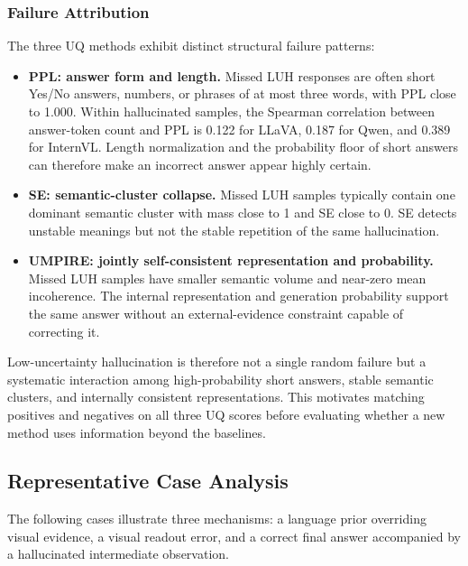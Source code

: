 \subsubsection{Failure Attribution}

The three UQ methods exhibit distinct structural failure patterns:

\begin{itemize}[leftmargin=2em]
\item \textbf{PPL: answer form and length.} Missed LUH responses are often short Yes/No answers, numbers, or phrases of at most three words, with PPL close to 1.000. Within hallucinated samples, the Spearman correlation between answer-token count and PPL is 0.122 for LLaVA, 0.187 for Qwen, and 0.389 for InternVL. Length normalization and the probability floor of short answers can therefore make an incorrect answer appear highly certain.
\item \textbf{SE: semantic-cluster collapse.} Missed LUH samples typically contain one dominant semantic cluster with mass close to 1 and SE close to 0. SE detects unstable meanings but not the stable repetition of the same hallucination.
\item \textbf{UMPIRE: jointly self-consistent representation and probability.} Missed LUH samples have smaller semantic volume and near-zero mean incoherence. The internal representation and generation probability support the same answer without an external-evidence constraint capable of correcting it.
\end{itemize}

Low-uncertainty hallucination is therefore not a single random failure but a systematic interaction among high-probability short answers, stable semantic clusters, and internally consistent representations. This motivates matching positives and negatives on all three UQ scores before evaluating whether a new method uses information beyond the baselines.

\subsection{Representative Case Analysis}
\label{subsec:representative_cases}

The following cases illustrate three mechanisms: a language prior overriding visual evidence, a visual readout error, and a correct final answer accompanied by a hallucinated intermediate observation.

